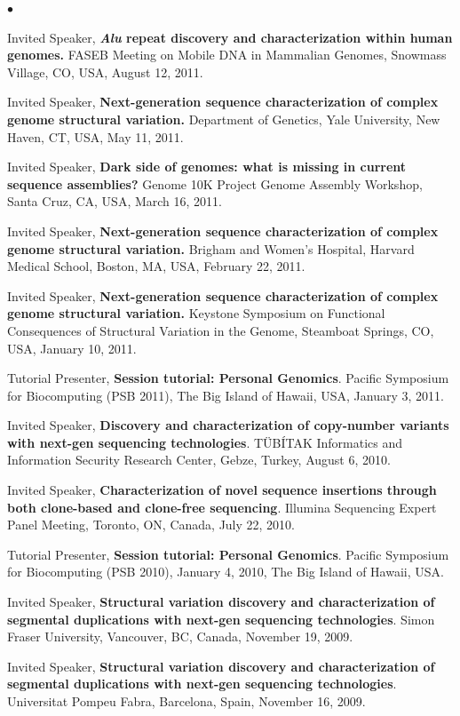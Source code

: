\documentclass[margin,line]{res}
\newenvironment{list2}{
  \begin{list}{$\bullet$}{%
      \setlength{\itemsep}{0in}
      \setlength{\parsep}{0in} \setlength{\parskip}{0in}
      \setlength{\topsep}{0in} \setlength{\partopsep}{0in} 
      \setlength{\leftmargin}{0.2in}}}{\end{list}}
\begin{document}
\begin{resume}
\begin{list2}
\item
  Invited Speaker, 
  {\bf {\it Alu} repeat discovery and characterization within human genomes.}
  FASEB Meeting on Mobile DNA in Mammalian Genomes, Snowmass Village, CO, USA, August 12, 2011.

\item
  Invited Speaker, 
  {\bf  Next-generation sequence characterization of complex genome structural variation.}
  Department of Genetics, Yale University, New Haven, CT, USA, May 11, 2011.

\item
  Invited Speaker, 
  {\bf Dark side of genomes: what is missing in current sequence assemblies?}
  Genome 10K Project Genome Assembly Workshop, Santa Cruz, CA, USA, March 16, 2011.



\item
  Invited Speaker, 
  {\bf  Next-generation sequence characterization of complex genome structural variation.}
 Brigham and Women's Hospital, Harvard Medical School, Boston, MA, USA, February 22, 2011.

\item
  Invited Speaker, 
  {\bf  Next-generation sequence characterization of complex genome structural variation.}
  Keystone Symposium on Functional Consequences of Structural Variation in the Genome,
  Steamboat Springs, CO, USA, January 10, 2011.
\item 
  Tutorial Presenter, {\bf Session tutorial: Personal Genomics}.
  Pacific Symposium for Biocomputing (PSB 2011),
  The Big Island of Hawaii, USA,   January 3, 2011.
\clearpage
\item
  Invited Speaker, {\bf Discovery and characterization of copy-number variants with next-gen sequencing technologies}.
  T\"{U}B\'{I}TAK Informatics and Information Security Research Center, Gebze, Turkey, August 6, 2010.
\item
  Invited Speaker, {\bf Characterization of novel sequence insertions through both clone-based and clone-free sequencing}. Illumina Sequencing Expert Panel Meeting, 
  Toronto, ON, Canada, July 22, 2010.
\item 
  Tutorial Presenter, {\bf Session tutorial: Personal Genomics}.
  Pacific Symposium for Biocomputing (PSB 2010),
  January 4, 2010, The Big Island of Hawaii, USA.

\item 
  Invited Speaker, {\bf Structural variation discovery and characterization of segmental duplications with next-gen sequencing technologies}.
  Simon Fraser University,
  Vancouver, BC, Canada, November 19, 2009.
\item 
  Invited Speaker, {\bf Structural variation discovery and characterization of segmental duplications with next-gen sequencing technologies}.
  Universitat Pompeu Fabra,
  Barcelona, Spain, November 16, 2009.


\end{list2}
\end{resume}
\end{document}
